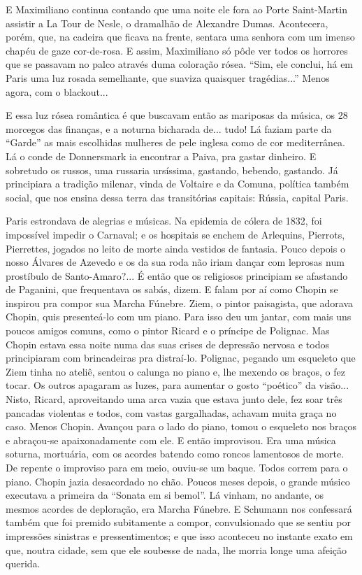 E Maximiliano continua contando que uma noite ele fora ao Porte
Saint-Martin assistir a La Tour de Nesle, o dramalhão de Alexandre
Dumas. Acontecera, porém, que, na cadeira que ficava na frente, sentara
uma senhora com um imenso chapéu de gaze cor-de-rosa. E assim,
Maximiliano só pôde ver todos os horrores que se passavam no palco
através duma coloração rósea. ``Sim, ele conclui, há em Paris uma luz
rosada semelhante, que suaviza quaisquer tragédias...'' Menos agora, com
o blackout...

E essa luz rósea romântica é que buscavam então as mariposas da música,
os 28 morcegos das finanças, e a noturna bicharada de... tudo! Lá faziam
parte da ``Garde'' as mais escolhidas mulheres de pele inglesa como de
cor mediterrânea. Lá o conde de Donnersmark ia encontrar a Paiva, pra
gastar dinheiro. E sobretudo os russos, uma russaria ursíssima,
gastando, bebendo, gastando. Já principiara a tradição milenar, vinda de
Voltaire e da Comuna, política também social, que nos ensina dessa terra
das transitórias capitais: Rússia, capital Paris.

Paris estrondava de alegrias e músicas. Na epidemia de cólera de 1832,
foi impossível impedir o Carnaval; e os hospitais se enchem de
Arlequins, Pierrots, Pierrettes, jogados no leito de morte ainda
vestidos de fantasia. Pouco depois o nosso Álvares de Azevedo e os da
sua roda não iriam dançar com leprosas num prostíbulo de Santo-Amaro?...
É então que os religiosos principiam se afastando de Paganini, que
frequentava os sabás, dizem. E falam por aí como Chopin se inspirou pra
compor sua Marcha Fúnebre. Ziem, o pintor paisagista, que adorava
Chopin, quis presenteá-lo com um piano. Para isso deu um jantar, com
mais uns poucos amigos comuns, como o pintor Ricard e o príncipe de
Polignac. Mas Chopin estava essa noite numa das suas crises de depressão
nervosa e todos principiaram com brincadeiras pra distraí-lo. Polignac,
pegando um esqueleto que Ziem tinha no ateliê, sentou o calunga no piano
e, lhe mexendo os braços, o fez tocar. Os outros apagaram as luzes, para
aumentar o gosto ``poético'' da visão... Nisto, Ricard, aproveitando uma
arca vazia que estava junto dele, fez soar três pancadas violentas e
todos, com vastas gargalhadas, achavam muita graça no caso. Menos
Chopin. Avançou para o lado do piano, tomou o esqueleto nos braços e
abraçou-se apaixonadamente com ele. E então improvisou. Era uma música
soturna, mortuária, com os acordes batendo como roncos lamentosos de
morte. De repente o improviso para em meio, ouviu-se um baque. Todos
correm para o piano. Chopin jazia desacordado no chão. Poucos meses
depois, o grande músico executava a primeira da ``Sonata em si bemol''.
Lá vinham, no andante, os mesmos acordes de deploração, era Marcha
Fúnebre. E Schumann nos confessará também que foi premido subitamente a
compor, convulsionado que se sentiu por impressões sinistras e
pressentimentos; e que isso aconteceu no instante exato em que, noutra
cidade, sem que ele soubesse de nada, lhe morria longe uma afeição
querida.

